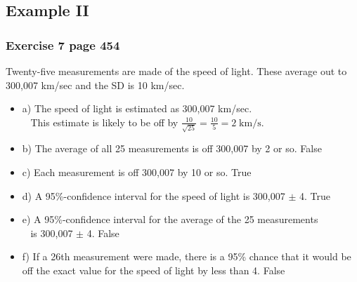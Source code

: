 \documentclass[t]{beamer}
\begin{document}
\subsection{Example II}
\begin{frame}
\frametitle{Exercise 7 page 454}

\footnotesize

Twenty-five measurements are made of the speed of light.  These average out to 300,007 km/sec and the SD is 10 km/sec.

\begin{itemize}
\item<2-> a) The speed of light is estimated as 
{\color{blue}300,007 km/sec}.  \\[3pt]
{\ }{\hphantom{a}} This estimate is likely to be off by 
{\color{blue}$\frac{10}{\sqrt{25}}=\frac{10}{5}=2\;\mbox{km/s}$}.
\item<3-> b) The average of all 25 measurements is off 300,007 by 2 or so.  {\color{blue}False}
\item<4-> c) Each measurement is off 300,007 by 10 or so.  {\color{blue}True}
\item<5-> d) A 95\%-confidence interval for the speed of light is 300,007 $\pm$ 4.   {\color{blue}True}
\item<6-> e) A 95\%-confidence interval for the average of the 25 measurements \\ {\ }\hphantom{a} is
   300,007 $\pm$ 4.  {\color{blue}False}
\item<7-> f) If a 26th measurement were made, there is a 95\% chance that it would be off the exact value for the 
speed of light by less than 4.  {\color{blue}False}
\end{itemize}
\label{lastpage}
\end{frame}
\end{document}

